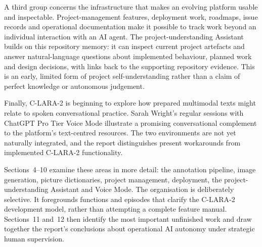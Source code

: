 A third group concerns the infrastructure that makes an evolving platform
usable and inspectable. Project-management features, deployment work,
roadmaps, issue records and operational documentation make it possible to
track work beyond an individual interaction with an AI agent. The
project-understanding Assistant builds on this repository memory: it can
inspect current project artefacts and answer natural-language questions about
implemented behaviour, planned work and design decisions, with links back to
the supporting repository evidence. This is an early, limited form of project
self-understanding rather than a claim of perfect knowledge or autonomous
judgement.

Finally, C-LARA-2 is beginning to explore how prepared multimodal texts might
relate to spoken conversational practice. Sarah Wright's regular sessions with
ChatGPT Pro Tier Voice Mode illustrate a promising conversational complement
to the platform's text-centred resources. The two environments are not yet
naturally integrated, and the report distinguishes present workarounds from
implemented C-LARA-2 functionality.

Sections~4--10 examine these areas in more detail: the annotation pipeline,
image generation, picture dictionaries, project management, deployment, the
project-understanding Assistant and Voice Mode. The organisation is
deliberately selective. It foregrounds functions and episodes that clarify
the C-LARA-2 development model, rather than attempting a complete feature
manual. Sections~11 and~12 then identify the most important unfinished work
and draw together the report's conclusions about operational AI autonomy under
strategic human supervision.

